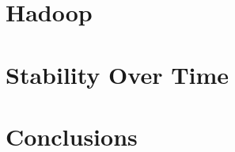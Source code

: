 \documentclass{acm_proc_article-sp}
\begin{document}
\section{Hadoop}

\section{Stability Over Time}

\section{Conclusions}



\end{document}
